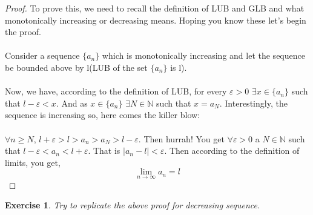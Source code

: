 \documentclass{article}
\newtheorem{exercise}{Exercise}[section]
\begin{document}
\begin{proof}
    To prove this, we need to recall the definition of LUB and GLB and what monotonically increasing or decreasing means.
    Hoping you know these let's begin the proof. \\\\
    Consider a sequence $\{a_n\}$ which is monotonically increasing and let the sequence be bounded above by l(LUB of the set $\{a_n\}$ is l). \\\\
    Now, we have, according to the definition of LUB, for every $\varepsilon >0$ $\exists x \in \{a_n\}$ such that $l-\varepsilon <x$. And as $x \in \{a_n\}$ $\exists N \in \mathbb{N}$ such that $x=a_N$. Interestingly, the sequence is increasing so, here comes the killer blow:\\\\
    $\forall n\geq N$, $l+\varepsilon>l>a_n>a_N>l-\varepsilon$. Then hurrah! You get $\forall \varepsilon >0$ a $N  \in \mathbb{N}$ such that $l-\varepsilon <a_n<l+\varepsilon$. That is $|a_n-l|<\varepsilon$. Then according to the definition of limits, you get,
    $$\lim_{n \to \infty}a_n=l$$
\end{proof}

\begin{exercise}
    Try to replicate the above proof for decreasing sequence.
\end{exercise}
\end{document}
